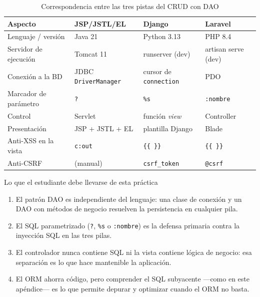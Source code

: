 \begin{table}[H]
\centering
\caption{Correspondencia entre las tres pistas del CRUD con DAO}
\label{tab:crud-comparacion}
\small
\renewcommand{\arraystretch}{1.3}
\begin{tabular}{>{\raggedright\arraybackslash}p{2.8cm}
                >{\raggedright\arraybackslash}p{3.4cm}
                >{\raggedright\arraybackslash}p{3.2cm}
                >{\raggedright\arraybackslash}p{3.2cm}}
\toprule
\textbf{Aspecto} & \textbf{JSP/JSTL/EL} & \textbf{Django} & \textbf{Laravel} \\
\midrule
Lenguaje / versión & Java 21 & Python 3.13 & PHP 8.4 \\
Servidor de ejecución & Tomcat 11 & runserver (dev) & artisan serve (dev) \\
Conexión a la BD & JDBC \texttt{DriverManager} & cursor de \texttt{connection} & PDO \\
Marcador de parámetro & \texttt{?} & \texttt{\%s} & \texttt{:nombre} \\
Control & Servlet & función \emph{view} & Controller \\
Presentación & JSP + JSTL + EL & plantilla Django & Blade \\
Anti-XSS en la vista & \texttt{c:out} & \texttt{\{\{ \}\}} & \texttt{\{\{ \}\}} \\
Anti-CSRF & (manual) & \texttt{csrf\_token} & \texttt{@csrf} \\
\bottomrule
\end{tabular}
\end{table}

\begin{cajabuenas}{Lo que el estudiante debe llevarse de esta práctica}
\begin{enumerate}
\item El patrón DAO es independiente del lenguaje: una clase de
conexión y un DAO con métodos de negocio resuelven la persistencia en
cualquier pila.
\item El SQL parametrizado (\texttt{?}, \texttt{\%s} o \texttt{:nombre})
es la defensa primaria contra la inyección SQL en las tres pilas.
\item El controlador nunca contiene SQL ni la vista contiene lógica de
negocio: esa separación es lo que hace mantenible la aplicación.
\item El ORM ahorra código, pero comprender el SQL subyacente ---como
en este apéndice--- es lo que permite depurar y optimizar cuando el ORM
no basta.
\end{enumerate}
\end{cajabuenas}

